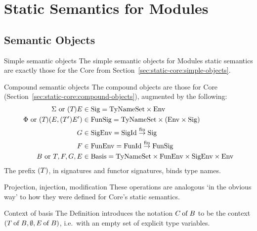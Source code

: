 \chapter{Static Semantics for Modules}\label{ch:static-modules}

\section{Semantic Objects}\label{sec:static-modules:compound-objects}

\begin{clause}{Simple semantic objects}
The simple semantic objects for Modules static semantics are exactly
those for the Core from Section~\ref{sec:static-core:simple-objects}.
\end{clause}

\begin{definition}{Compound semantic objects}\label{defn:static-modules:compound-objects}
The compound objects are those for Core (Section~\ref{sec:static-core:compound-objects}),
augmented by the following:
\begin{align*}
\Sigma\ {\rm or}\ (T_{})E_{}
                & \in    {\rm Sig} =  {\rm TyNameSet}\times{\rm Env} \\
\Phi\ {\rm or}\ (T_{})(E_{},(T_{}')E_{}')
                & \in    {\rm FunSig} = {\rm TyNameSet}\times
                                         ({\rm Env}\times{\rm Sig})\\
G              & \in    {\rm SigEnv}        =       {\rm SigId}\stackrel{{\rm fin}}{\to}{\rm Sig} \\
F              & \in    {\rm FunEnv}        =       {\rm FunId}\stackrel{{\rm fin}}{\to}{\rm FunSig} \\
B\ {\rm or}\ T,F,G,E
                & \in    {\rm Basis} = {\rm TyNameSet}\times
                                              {\rm FunEnv}\times{\rm SigEnv}\times{\rm Env}
\end{align*}
The 
prefix $(T)$, in signatures and functor signatures, binds  type names.
\end{definition}

\begin{clause}{Projection, injection, modification}
These operations are analogous `in the obvious way' to how they were
defined for Core's static semantics.
\end{clause}

\begin{definition}{Context of basis}
The Definition introduces the notation $C \mathbin{\rm of} B$ to be the context
$(T \mathbin{\rm of} B,\emptyset,E \mathbin{\rm of} B)$, i.e.~with an empty set of
explicit type variables.
\end{definition}


